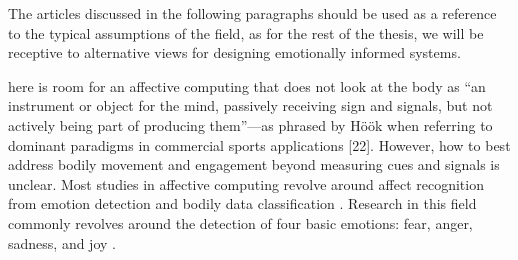 
The articles discussed in the following paragraphs should be used as a reference to the typical assumptions of the field, as for the rest of the thesis, we will be receptive to alternative views for designing emotionally informed systems. 

here is room for an affective computing that does not look at the body as “an instrument or object for the mind, passively receiving sign and signals, but not actively being part of producing them”—as phrased by Höök when referring to dominant paradigms in commercial sports applications [22]. However, how to best address bodily movement and engagement beyond measuring cues and signals is unclear. Most studies in affective computing revolve around affect recognition from emotion detection and bodily data classification \cite{bota_review_2019}. Research in this field commonly revolves around the detection of four basic emotions: fear, anger, sadness, and joy \cite{picard_mit_nodate}.


